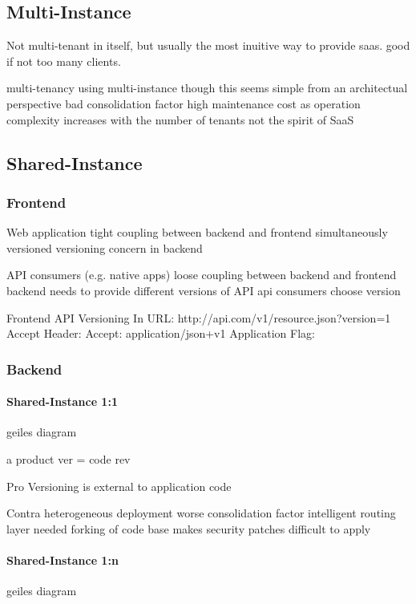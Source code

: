 \subsection{Multi-Instance}

Not multi-tenant in itself, but usually the most inuitive way to provide saas. good if not too many clients.

multi-tenancy using multi-instance
though this seems simple from an architectual perspective
bad consolidation factor
high maintenance cost as operation complexity increases with the number of tenants
not the spirit of SaaS

\subsection{Shared-Instance}

\subsubsection{Frontend}
  Web application
  tight coupling between backend and frontend
  simultaneously versioned
  versioning concern in backend

  API consumers (e.g. native apps)
  loose coupling between backend and frontend
  backend needs to provide different versions of API
  api consumers choose version

  Frontend API Versioning
    In URL:
      http://api.com/v1/resource.json?version=1
    Accept Header:
      Accept: application/json+v1
    Application Flag:

\subsubsection{Backend}
\paragraph{Shared-Instance 1:1}
geiles diagram

a product ver = code rev


Pro
Versioning is external to application code

Contra
heterogeneous deployment
worse consolidation factor
intelligent routing layer needed
forking of code base makes security patches difficult to apply



\paragraph{Shared-Instance 1:n}
geiles diagram


